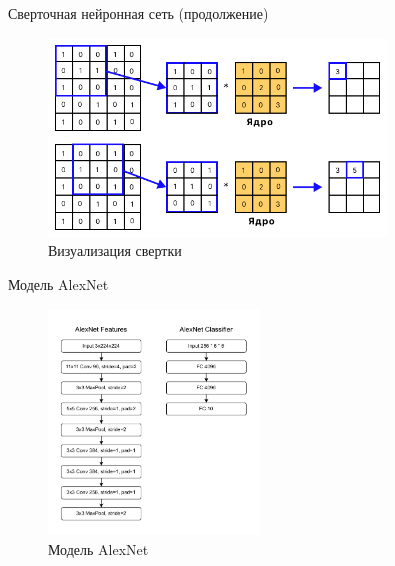 \documentclass[12pt]{beamer}
\begin{document}
\begin{frame}{Сверточная нейронная сеть (продолжение)}
    \begin{figure}[ht]
        \centering
        \includegraphics[width=0.8\textwidth]{images/conv_window.png}
        \caption{Визуализация свертки}
        \label{fig:conv}
    \end{figure}
\end{frame}

\begin{frame}{Модель AlexNet}
    \begin{figure}[ht]
        \centering
        \includegraphics[width=0.5\textwidth]{images/alexnet_model.pdf}
        \caption{Модель AlexNet}
        \label{fig:alexnet}
    \end{figure}
\end{frame}
\end{document}
